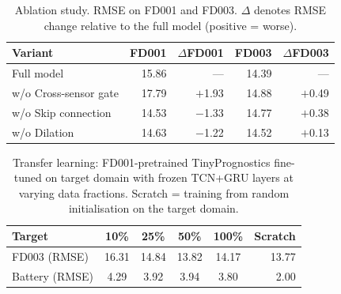 \begin{table}[t]
\centering
\caption{Ablation study. RMSE on FD001 and FD003.
$\Delta$ denotes RMSE change relative to the full model (positive = worse).}
\label{tab:ablation}
\begin{tabular}{lrrrr}
\toprule
Variant & FD001 & $\Delta$FD001 & FD003 & $\Delta$FD003 \\
\midrule
Full model                & 15.86 & —        & 14.39 & —      \\
\quad w/o Cross-sensor gate & 17.79 & $+$1.93  & 14.88 & $+$0.49 \\
\quad w/o Skip connection   & 14.53 & $-$1.33  & 14.77 & $+$0.38 \\
\quad w/o Dilation          & 14.63 & $-$1.22  & 14.52 & $+$0.13 \\
\bottomrule
\end{tabular}
\end{table}

\begin{table}[t]
\centering
\caption{Transfer learning: FD001-pretrained TinyPrognostics fine-tuned
on target domain with frozen TCN+GRU layers at varying data fractions.
Scratch = training from random initialisation on the target domain.}
\label{tab:transfer}
\begin{tabular}{lccccr}
\toprule
Target & 10\% & 25\% & 50\% & 100\% & Scratch \\
\midrule
FD003 (RMSE)   & 16.31 & 14.84 & 13.82 & 14.17 & 13.77 \\
Battery (RMSE) & 4.29  & 3.92  & 3.94  & 3.80  & 2.00  \\
\bottomrule
\end{tabular}
\end{table}


